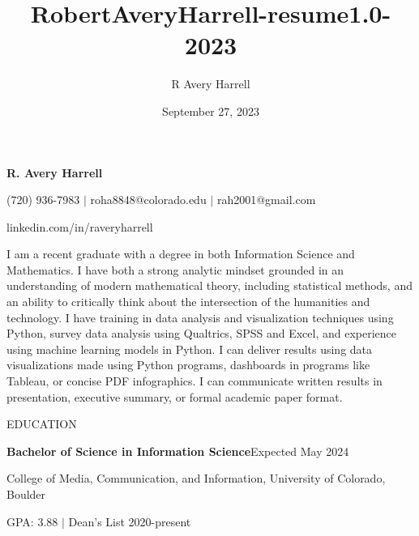 \documentclass{article}
\title{RobertAveryHarrell-resume1.0-2023}
\author{R Avery Harrell}
\date{September 27, 2023} %
\newcommand{\sectionSpace}{\vspace{0.3in}}
\begin{document}
\begin{center}
{\huge \textbf{R. Avery Harrell}}

\vspace{0.05in}

{\large(720) 936-7983 $\vert$ roha8848@colorado.edu $\vert$ rah2001@gmail.com}

\vspace{0.05in}

{\large linkedin.com/in/raveryharrell}
\end{center}

\hrulefill


\begin{minipage}[t]{1\linewidth}
I am a recent graduate with a degree in both Information Science and Mathematics. I have both a strong analytic mindset grounded in an understanding of modern mathematical theory, including statistical methods, and an ability to critically think about the intersection of the humanities and technology. I have training in data analysis and visualization techniques using Python, survey data analysis using Qualtrics, SPSS and Excel, and experience using machine learning models in Python. I can deliver results using data visualizations made using Python programs, dashboards in programs like Tableau, or concise PDF infographics. I can communicate written results in presentation, executive summary, or formal academic paper format.
\end{minipage}%


\sectionSpace

\begin{minipage}[t]{0.125\linewidth}
\uppercase{Education}
\end{minipage}%
\hfill
\begin{minipage}[t]{0.85\linewidth}
\textbf{Bachelor of Science in Information Science}\hfill Expected May 2024

College of Media, Communication, and Information, University of Colorado, Boulder

GPA: 3.88 $\vert$ Dean's List 2020-present

\end{minipage}

\begin{minipage}[t]{0.125\linewidth}
\uppercase{}
\end{minipage}%
\hfill
\end{document}
